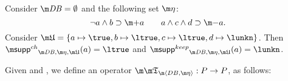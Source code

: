 \begin{example}
 Consider $\db=\emptyset$ and the following set $\aics$:
 \[\lnot a\land b \aicrule \add a\qquad a \land c\land d \aicrule\remove a.\]
 Consider $\UUU = \{a\mapsto\true,b\mapsto\ltrue, c\mapsto\ltrue, d\mapsto\lunkn\}$. 
 Then  $\suppin_{\db,\aics,\UUU}(a)=\ltrue$ and $\suppout_{\db,\aics,\UUU}(a)=\lunkn$. 
\end{example}





\begin{definition} \label{def:apfull}
Given \db and \aics, we define an operator $\Apfull: P\to P$, as follows:

% 
% 
% 
% 
% 
% 
% 	

\end{definition}
